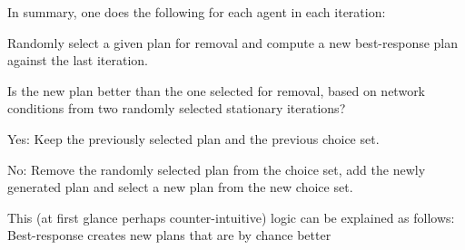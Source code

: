 %
%
%
In summary, one does the following
for each agent in each iteration:
\begin{compactenum}
\item Randomly select a given plan for removal
%
%
%
%
%
and compute a new best-response plan against the last iteration.
\item Is the new plan better than the one selected for removal, 
based on network conditions from two randomly selected stationary
iterations?

\begin{compactitem}
\item Yes: Keep the previously selected plan and the previous choice set.
\item No: Remove the randomly selected plan from the choice set, add the
newly generated plan and select a new plan from the new choice set.
\end{compactitem}
\end{compactenum}
This (at first glance perhaps counter-intuitive) logic can be explained as
follows:
Best-response creates new plans that are\corr{,}{} by chance\corr{,}{} better
